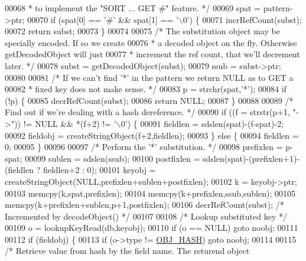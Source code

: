 \begin{DoxyCode}
00068 \textcolor{comment}{     * to implement the "SORT ... GET #" feature. */}
00069     spat = pattern->ptr;
00070     \textcolor{keywordflow}{if} (spat[0] == \textcolor{stringliteral}{'#'} && spat[1] == \textcolor{stringliteral}{'\(\backslash\)0'}) \{
00071         incrRefCount(subst);
00072         \textcolor{keywordflow}{return} subst;
00073     \}
00074 
00075     \textcolor{comment}{/* The substitution object may be specially encoded. If so we create}
00076 \textcolor{comment}{     * a decoded object on the fly. Otherwise getDecodedObject will just}
00077 \textcolor{comment}{     * increment the ref count, that we'll decrement later. */}
00078     subst = getDecodedObject(subst);
00079     ssub = subst->ptr;
00080 
00081     \textcolor{comment}{/* If we can't find '*' in the pattern we return NULL as to GET a}
00082 \textcolor{comment}{     * fixed key does not make sense. */}
00083     p = strchr(spat,\textcolor{stringliteral}{'*'});
00084     \textcolor{keywordflow}{if} (!p) \{
00085         decrRefCount(subst);
00086         \textcolor{keywordflow}{return} NULL;
00087     \}
00088 
00089     \textcolor{comment}{/* Find out if we're dealing with a hash dereference. */}
00090     \textcolor{keywordflow}{if} ((f = strstr(p+1, \textcolor{stringliteral}{"->"})) != NULL && *(f+2) != \textcolor{stringliteral}{'\(\backslash\)0'}) \{
00091         fieldlen = sdslen(spat)-(f-spat)-2;
00092         fieldobj = createStringObject(f+2,fieldlen);
00093     \} \textcolor{keywordflow}{else} \{
00094         fieldlen = 0;
00095     \}
00096 
00097     \textcolor{comment}{/* Perform the '*' substitution. */}
00098     prefixlen = p-spat;
00099     sublen = sdslen(ssub);
00100     postfixlen = sdslen(spat)-(prefixlen+1)-(fieldlen ? fieldlen+2 : 0);
00101     keyobj = createStringObject(NULL,prefixlen+sublen+postfixlen);
00102     k = keyobj->ptr;
00103     memcpy(k,spat,prefixlen);
00104     memcpy(k+prefixlen,ssub,sublen);
00105     memcpy(k+prefixlen+sublen,p+1,postfixlen);
00106     decrRefCount(subst); \textcolor{comment}{/* Incremented by decodeObject() */}
00107 
00108     \textcolor{comment}{/* Lookup substituted key */}
00109     o = lookupKeyRead(db,keyobj);
00110     \textcolor{keywordflow}{if} (o == NULL) \textcolor{keywordflow}{goto} noobj;
00111 
00112     \textcolor{keywordflow}{if} (fieldobj) \{
00113         \textcolor{keywordflow}{if} (o->type != \hyperlink{server_8h_a87c05ba4f7f36741864277f02a4423fb}{OBJ\_HASH}) \textcolor{keywordflow}{goto} noobj;
00114 
00115         \textcolor{comment}{/* Retrieve value from hash by the field name. The returend object}

\end{DoxyCode}
